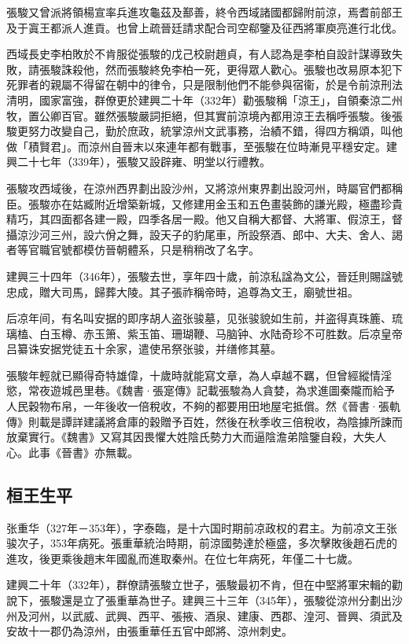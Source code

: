 張駿又曾派將領楊宣率兵進攻龜茲及鄯善，終令西域諸國都歸附前涼，焉耆前部王及于寘王都派人進貢。也曾上疏晉廷請求配合司空郗鑒及征西將軍庾亮進行北伐。

西域長史李柏敗於不肯服從張駿的戊己校尉趙貞，有人認為是李柏自設計謀導致失敗，請張駿誅殺他，然而張駿終免李柏一死，更得眾人歡心。張駿也改易原本犯下死罪者的親屬不得留在朝中的律令，只是限制他們不能參與宿衞，於是令前涼刑法清明，國家富強，群僚更於建興二十年（332年）勸張駿稱「涼王」，自領秦涼二州牧，置公卿百官。雖然張駿嚴詞拒絕，但其實前涼境內都用涼王去稱呼張駿。後張駿更努力改變自己，勤於庶政，統掌涼州文武事務，治績不錯，得四方稱頌，叫他做「積賢君」。而涼州自晉末以來連年都有戰事，至張駿在位時漸見平穩安定。建興二十七年（339年），張駿又設辟雍、明堂以行禮教。

張駿攻西域後，在涼州西界劃出設沙州，又將涼州東界劃出設河州，時屬官們都稱臣。張駿亦在姑臧附近增築新城，又修建用金玉和五色畫裝飾的謙光殿，極盡珍貴精巧，其四面都各建一殿，四季各居一殿。他又自稱大都督、大將軍、假涼王，督攝涼沙河三州，設六佾之舞，設天子的豹尾車，所設祭酒、郎中、大夫、舍人、謁者等官職官號都模仿晉朝體系，只是稍稍改了名字。

建興三十四年（346年），張駿去世，享年四十歲，前涼私諡為文公，晉廷則賜諡號忠成，贈大司馬，歸葬大陵。其子張祚稱帝時，追尊為文王，廟號世祖。

后凉年间，有名叫安据的即序胡人盗张骏墓，见张骏貌如生前，并盗得真珠簏、琉璃榼、白玉樽、赤玉箫、紫玉笛、珊瑚鞭、马脑钟、水陆奇珍不可胜数。后凉皇帝吕纂诛安据党徒五十余家，遣使吊祭张骏，并缮修其墓。

張駿年輕就已顯得奇特雄偉，十歲時就能寫文章，為人卓越不羈，但曾經縱情淫慾，常夜遊城邑里巷。《魏書·張寔傳》記載張駿為人貪婪，為求進圖秦隴而給予人民穀物布帛，一年後收一倍稅收，不夠的都要用田地屋宅抵償。然《晉書·張軌傳》則載是譚詳建議將倉庫的穀贈予百姓，然後在秋季收三倍稅收，為陰據所諫而放棄實行。《魏書》又寫其因畏懼大姓陰氏勢力大而逼陰澹弟陰鑒自殺，大失人心。此事《晉書》亦無載。


\subsection{桓王生平}

张重华（327年－353年），字泰臨，是十六国时期前凉政权的君主。为前凉文王张骏次子，353年病死。張重華統治時期，前涼國勢達於極盛，多次擊敗後趙石虎的進攻，後更乘後趙末年國亂而進取秦州。在位七年病死，年僅二十七歲。

建興二十年（332年），群僚請張駿立世子，張駿最初不肯，但在中堅將軍宋輯的勸說下，張駿還是立了張重華為世子。建興三十三年（345年），張駿從涼州分劃出沙州及河州，以武威、武興、西平、張掖、酒泉、建康、西郡、湟河、晉興、須武及安故十一郡仍為涼州，由張重華任五官中郎將、涼州刺史。

